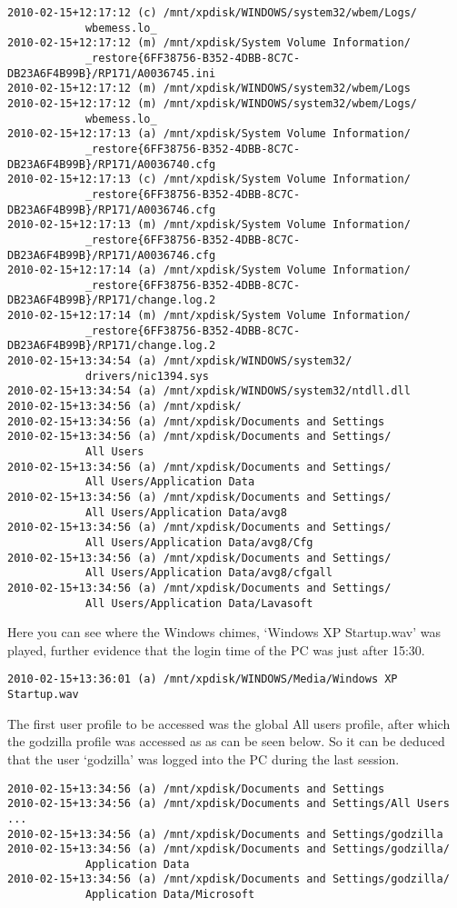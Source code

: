 \documentclass[a4paper,
    11pt,
    normalheadings,
    parindent,
    UKenglish,
    abstracton,
    ]{scrartcl}
\begin{document}
\begin{verbatim}
2010-02-15+12:17:12 (c) /mnt/xpdisk/WINDOWS/system32/wbem/Logs/
            wbemess.lo_
2010-02-15+12:17:12 (m) /mnt/xpdisk/System Volume Information/
            _restore{6FF38756-B352-4DBB-8C7C-DB23A6F4B99B}/RP171/A0036745.ini
2010-02-15+12:17:12 (m) /mnt/xpdisk/WINDOWS/system32/wbem/Logs
2010-02-15+12:17:12 (m) /mnt/xpdisk/WINDOWS/system32/wbem/Logs/
            wbemess.lo_
2010-02-15+12:17:13 (a) /mnt/xpdisk/System Volume Information/
            _restore{6FF38756-B352-4DBB-8C7C-DB23A6F4B99B}/RP171/A0036740.cfg
2010-02-15+12:17:13 (c) /mnt/xpdisk/System Volume Information/
            _restore{6FF38756-B352-4DBB-8C7C-DB23A6F4B99B}/RP171/A0036746.cfg
2010-02-15+12:17:13 (m) /mnt/xpdisk/System Volume Information/
            _restore{6FF38756-B352-4DBB-8C7C-DB23A6F4B99B}/RP171/A0036746.cfg
2010-02-15+12:17:14 (a) /mnt/xpdisk/System Volume Information/
            _restore{6FF38756-B352-4DBB-8C7C-DB23A6F4B99B}/RP171/change.log.2
2010-02-15+12:17:14 (m) /mnt/xpdisk/System Volume Information/
            _restore{6FF38756-B352-4DBB-8C7C-DB23A6F4B99B}/RP171/change.log.2
2010-02-15+13:34:54 (a) /mnt/xpdisk/WINDOWS/system32/
            drivers/nic1394.sys
2010-02-15+13:34:54 (a) /mnt/xpdisk/WINDOWS/system32/ntdll.dll
2010-02-15+13:34:56 (a) /mnt/xpdisk/
2010-02-15+13:34:56 (a) /mnt/xpdisk/Documents and Settings
2010-02-15+13:34:56 (a) /mnt/xpdisk/Documents and Settings/
            All Users
2010-02-15+13:34:56 (a) /mnt/xpdisk/Documents and Settings/
            All Users/Application Data
2010-02-15+13:34:56 (a) /mnt/xpdisk/Documents and Settings/
            All Users/Application Data/avg8
2010-02-15+13:34:56 (a) /mnt/xpdisk/Documents and Settings/
            All Users/Application Data/avg8/Cfg
2010-02-15+13:34:56 (a) /mnt/xpdisk/Documents and Settings/
            All Users/Application Data/avg8/cfgall
2010-02-15+13:34:56 (a) /mnt/xpdisk/Documents and Settings/
            All Users/Application Data/Lavasoft
\end{verbatim}

Here you can see where the Windows chimes, `Windows XP Startup.wav' was played, further evidence that the login time of the PC was just after 15:30.

\begin{verbatim}
2010-02-15+13:36:01 (a) /mnt/xpdisk/WINDOWS/Media/Windows XP Startup.wav
\end{verbatim}

The first user profile to be accessed was the global All users profile, after which the godzilla profile was accessed as as can be seen below.
So it can be deduced that the user `godzilla' was logged into the PC during the last session.
\begin{verbatim}
2010-02-15+13:34:56 (a) /mnt/xpdisk/Documents and Settings
2010-02-15+13:34:56 (a) /mnt/xpdisk/Documents and Settings/All Users
...
2010-02-15+13:34:56 (a) /mnt/xpdisk/Documents and Settings/godzilla
2010-02-15+13:34:56 (a) /mnt/xpdisk/Documents and Settings/godzilla/
            Application Data
2010-02-15+13:34:56 (a) /mnt/xpdisk/Documents and Settings/godzilla/
            Application Data/Microsoft
\end{verbatim}
\end{document}

